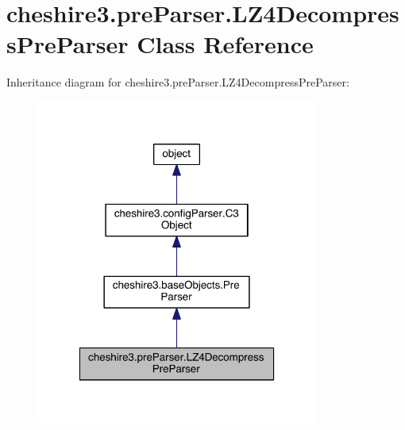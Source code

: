 \hypertarget{classcheshire3_1_1pre_parser_1_1_l_z4_decompress_pre_parser}{\section{cheshire3.\-pre\-Parser.\-L\-Z4\-Decompress\-Pre\-Parser Class Reference}
\label{classcheshire3_1_1pre_parser_1_1_l_z4_decompress_pre_parser}
}


Inheritance diagram for cheshire3.\-pre\-Parser.\-L\-Z4\-Decompress\-Pre\-Parser\-:
\nopagebreak
\begin{figure}[H]
\begin{center}
\leavevmode
\includegraphics[width=262pt]{classcheshire3_1_1pre_parser_1_1_l_z4_decompress_pre_parser__inherit__graph}
\end{center}
\end{figure}


